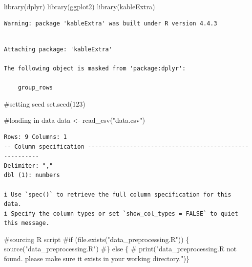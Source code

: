\documentclass[
  letterpaper,
  DIV=11,
  numbers=noendperiod]{scrartcl}
\newenvironment{Shaded}{\begin{snugshade}}{\end{snugshade}}
\newcommand{\CommentTok}[1]{\textcolor[rgb]{0.37,0.37,0.37}{#1}}
\newcommand{\DecValTok}[1]{\textcolor[rgb]{0.68,0.00,0.00}{#1}}
\newcommand{\FunctionTok}[1]{\textcolor[rgb]{0.28,0.35,0.67}{#1}}
\newcommand{\NormalTok}[1]{\textcolor[rgb]{0.00,0.23,0.31}{#1}}
\newcommand{\OtherTok}[1]{\textcolor[rgb]{0.00,0.23,0.31}{#1}}
\newcommand{\StringTok}[1]{\textcolor[rgb]{0.13,0.47,0.30}{#1}}
\begin{document}
\begin{Shaded}
\begin{Highlighting}[]
\FunctionTok{library}\NormalTok{(dplyr)}
\FunctionTok{library}\NormalTok{(ggplot2)}
\FunctionTok{library}\NormalTok{(kableExtra)}
\end{Highlighting}
\end{Shaded}

\begin{verbatim}
Warning: package 'kableExtra' was built under R version 4.4.3
\end{verbatim}

\begin{verbatim}

Attaching package: 'kableExtra'

The following object is masked from 'package:dplyr':

    group_rows
\end{verbatim}

\begin{Shaded}
\begin{Highlighting}[]
\CommentTok{\#setting seed}
\FunctionTok{set.seed}\NormalTok{(}\DecValTok{123}\NormalTok{)}

\CommentTok{\#loading in data}
\NormalTok{data }\OtherTok{\textless{}{-}} \FunctionTok{read\_csv}\NormalTok{(}\StringTok{"data.csv"}\NormalTok{)}
\end{Highlighting}
\end{Shaded}

\begin{verbatim}
Rows: 9 Columns: 1
-- Column specification --------------------------------------------------------
Delimiter: ","
dbl (1): numbers

i Use `spec()` to retrieve the full column specification for this data.
i Specify the column types or set `show_col_types = FALSE` to quiet this message.
\end{verbatim}

\begin{Shaded}
\begin{Highlighting}[]
\CommentTok{\#sourcing R script}
\CommentTok{\#if (file.exists("data\_preprocessing.R")) \{}
  \FunctionTok{source}\NormalTok{(}\StringTok{"data\_preprocessing.R"}\NormalTok{)}
\CommentTok{\#\} else \{}
\CommentTok{\#  print("\textquotesingle{}data\_preprocessing.R\textquotesingle{} not found. please make sure it exists in your working directory.")\}}
\end{Highlighting}
\end{Shaded}
\end{document}
